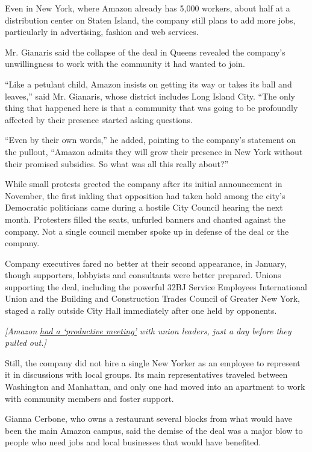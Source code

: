 Even in New York, where Amazon already has 5,000 workers, about half at
a distribution center on Staten Island, the company still plans to add
more jobs, particularly in advertising, fashion and web services.

Mr. Gianaris said the collapse of the deal in Queens revealed the
company's unwillingness to work with the community it had wanted to
join.

``Like a petulant child, Amazon insists on getting its way or takes its
ball and leaves,'' said Mr. Gianaris, whose district includes Long
Island City. ``The only thing that happened here is that a community
that was going to be profoundly affected by their presence started
asking questions.

``Even by their own words,'' he added, pointing to the company's
statement on the pullout, ``Amazon admits they will grow their presence
in New York without their promised subsidies. So what was all this
really about?''

While small protests greeted the company after its initial announcement
in November, the first inkling that opposition had taken hold among the
city's Democratic politicians came during a hostile City Council hearing
the next month. Protesters filled the seats, unfurled banners and
chanted against the company. Not a single council member spoke up in
defense of the deal or the company.

Company executives fared no better at their second appearance, in
January, though supporters, lobbyists and consultants were better
prepared. Unions supporting the deal, including the powerful 32BJ
Service Employees International Union and the Building and Construction
Trades Council of Greater New York, staged a rally outside City Hall
immediately after one held by opponents.

\emph{{[}Amazon}
\href{https://www.nytimes.com/2019/02/14/business/economy/amazon-union-cuomo.html}{\emph{had
a `productive meeting'}} \emph{with union leaders, just a day before
they pulled out.{]}}

Still, the company did not hire a single New Yorker as an employee to
represent it in discussions with local groups. Its main representatives
traveled between Washington and Manhattan, and only one had moved into
an apartment to work with community members and foster support.

Gianna Cerbone, who owns a restaurant several blocks from what would
have been the main Amazon campus, said the demise of the deal was a
major blow to people who need jobs and local businesses that would have
benefited.

